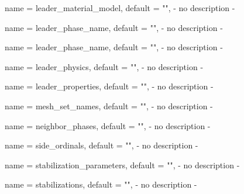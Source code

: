 \begin{parameter}{
    name    = {leader_material_model},
    default = {""},
}
- no description -
\end{parameter}

\begin{parameter}{
    name    = {leader_phase_name},
    default = {""},
}
- no description -
\end{parameter}

\begin{parameter}{
    name    = {leader_phase_name},
    default = {""},
}
- no description -
\end{parameter}

\begin{parameter}{
    name    = {leader_physics},
    default = {""},
}
- no description -
\end{parameter}

\begin{parameter}{
    name    = {leader_properties},
    default = {""},
}
- no description -
\end{parameter}

\begin{parameter}{
    name    = {mesh_set_names},
    default = {""},
}
- no description -
\end{parameter}

\begin{parameter}{
    name    = {neighbor_phases},
    default = {""},
}
- no description -
\end{parameter}

\begin{parameter}{
    name    = {side_ordinals},
    default = {""},
}
- no description -
\end{parameter}

\begin{parameter}{
    name    = {stabilization_parameters},
    default = {""},
}
- no description -
\end{parameter}

\begin{parameter}{
    name    = {stabilizations},
    default = {""},
}
- no description -
\end{parameter}

